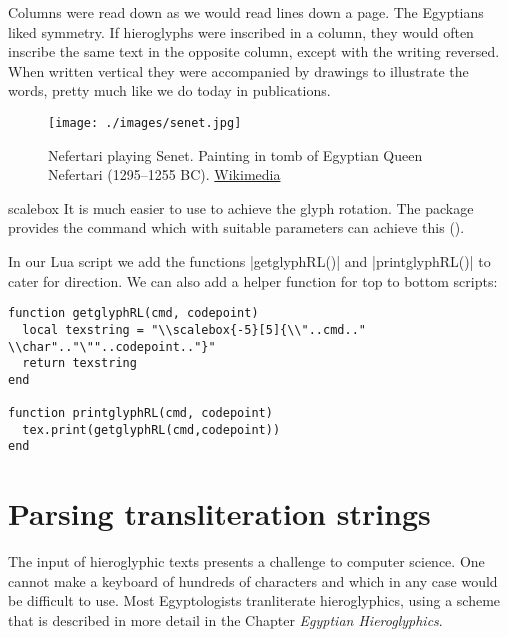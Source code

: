\begin{center}
{\hiero
\makebox[3em]{\scalebox{-2}[2]{\hiero
\char"13001}\hss}
\vskip3pt
\makebox[3em]{\scalebox{-2}[2]{\hiero
\char"13006}\hss}
\vskip3pt
\makebox[3em]{\scalebox{-2}[2]{\hiero
\char"13007}\hss}
}
\end{center}

Columns were read down as we would read lines down a page. The Egyptians liked symmetry. If hieroglyphs were inscribed in a column, they would often inscribe the same text in the opposite column, except with the writing reversed. When written vertical they were accompanied by drawings to illustrate the words, pretty much like we do today in publications.

\begin{figure}[hb]
\centering
\texttt{[image: ./images/senet.jpg]}
\caption{Nefertari playing Senet. Painting in tomb of Egyptian Queen Nefertari (1295–1255 BC). \href{http://en.wikipedia.org/wiki/Senet}{Wikimedia}}
\end{figure}



\begin{docCommand}{scalebox} {\oarg{[]} \oarg{[]} }
It is much easier to use \tex to achieve the glyph rotation. The package  provides the command \cmd{\scalebox} which with suitable parameters can achieve this ().
\end{docCommand}

In our Lua script we add the functions |getglyphRL()| and |printglyphRL()| to cater for direction. We can also add a helper function for top to bottom scripts:

\begin{verbatim}
function getglyphRL(cmd, codepoint)
  local texstring = "\\scalebox{-5}[5]{\\"..cmd.." \\char".."\""..codepoint.."}"
  return texstring
end

function printglyphRL(cmd, codepoint)
  tex.print(getglyphRL(cmd,codepoint))
end
\end{verbatim}

\section{Parsing transliteration strings}

The input of hieroglyphic texts presents a challenge to computer science. One cannot make a keyboard of hundreds of characters and which in any case would be difficult to use. 
Most Egyptologists tranliterate hieroglyphics, using a scheme that is described in more detail in the Chapter \textit{Egyptian Hieroglyphics}.

